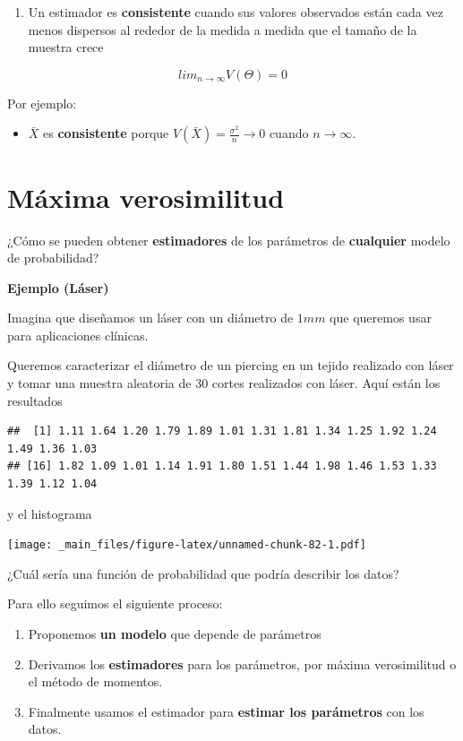 \documentclass[
]{book}
\providecommand{\tightlist}{%
  \setlength{\itemsep}{0pt}\setlength{\parskip}{0pt}}
\begin{document}
\begin{enumerate}
\def\labelenumi{\arabic{enumi}.}
\setcounter{enumi}{1}
\tightlist
\item
  Un estimador es \textbf{consistente} cuando sus valores observados están cada vez menos dispersos al rededor de la medida a medida que el tamaño de la muestra crece
\end{enumerate}

\[lim_{n\rightarrow \infty} V(\Theta) = 0\]

Por ejemplo:

\begin{itemize}
\tightlist
\item
  \(\bar{X}\) es \textbf{consistente} porque \(V(\bar{X})=\frac{\sigma^2}{n}\rightarrow 0\) cuando \(n \rightarrow \infty\).
\end{itemize}

\hypertarget{muxe1xima-verosimilitud}{%
\section{Máxima verosimilitud}\label{muxe1xima-verosimilitud}}

¿Cómo se pueden obtener \textbf{estimadores} de los parámetros de \textbf{cualquier} modelo de probabilidad?

\textbf{Ejemplo (Láser)}

Imagina que diseñamos un láser con un diámetro de \(1 mm\) que queremos usar para aplicaciones clínicas.

Queremos caracterizar el diámetro de un piercing en un tejido realizado con láser y tomar una muestra aleatoria de \(30\) cortes realizados con láser. Aquí están los resultados

\begin{verbatim}
##  [1] 1.11 1.64 1.20 1.79 1.89 1.01 1.31 1.81 1.34 1.25 1.92 1.24 1.49 1.36 1.03
## [16] 1.82 1.09 1.01 1.14 1.91 1.80 1.51 1.44 1.98 1.46 1.53 1.33 1.39 1.12 1.04
\end{verbatim}

y el histograma

\texttt{[image: \_main\_files/figure-latex/unnamed-chunk-82-1.pdf]}

¿Cuál sería una función de probabilidad que podría describir los datos?

Para ello seguimos el siguiente proceso:

\begin{enumerate}
\def\labelenumi{\arabic{enumi}.}
\tightlist
\item
  Proponemos \textbf{un modelo} que depende de parámetros
\item
  Derivamos los \textbf{estimadores} para los parámetros, por máxima verosimilitud o el método de momentos.
\item
  Finalmente usamos el estimador para \textbf{estimar los parámetros} con los datos.
\end{enumerate}
\end{document}
